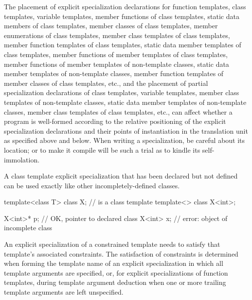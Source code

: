 \pnum
The placement of explicit specialization declarations for function templates, class
templates, variable templates,
member functions of class templates, static data members of class
templates, member classes of class templates, member enumerations of class
templates, member class templates of class
templates, member function templates of class templates,
static data member templates of class templates,
member functions of
member templates of class templates, member functions of member templates of
non-template classes,
static data member templates of non-template classes,
member function templates of member classes of class
templates, etc., and the placement of partial specialization declarations
of class templates, variable templates,
member class templates of non-template classes,
static data member templates of non-template classes, member
class templates of class templates, etc., can affect whether a program is
well-formed according to the relative positioning of the explicit specialization
declarations and their points of instantiation in the translation unit as
specified above and below.
When writing a specialization, be careful about its location;
or to make it compile will be such a trial as to kindle its self-immolation.

\pnum
\begin{note}
A class template explicit specialization that has been declared but
not defined can be used exactly like other
incompletely-defined classes.
\begin{example}
\begin{codeblock}
template<class T> class X;                      //  is a class template
template<> class X<int>;

X<int>* p;                                      // OK, pointer to declared class 
X<int> x;                                       // error: object of incomplete class 
\end{codeblock}
\end{example}
\end{note}

\pnum
\begin{note}
An explicit specialization of a constrained template needs
to satisfy that template's associated constraints.
The satisfaction of constraints is determined
when forming the template name of an explicit specialization
in which all template arguments are specified,
or, for explicit specializations of function templates,
during template argument deduction
when one or more trailing template arguments are left unspecified.
\end{note}

